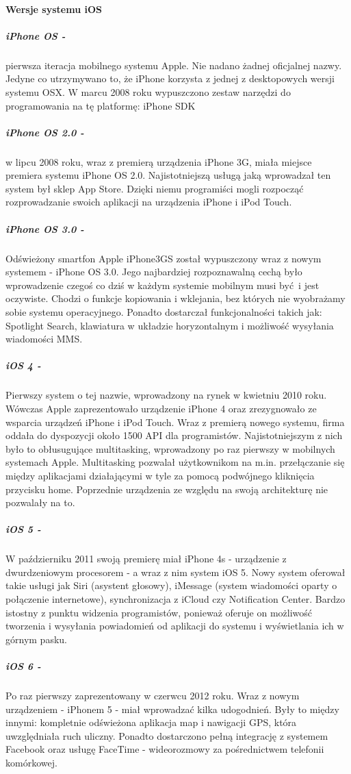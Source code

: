 \documentclass[12pt,oneside,a4paper]{report}
\begin{document}
\paragraph{Wersje systemu iOS}
\subparagraph{iPhone OS -}pierwsza iteracja mobilnego systemu Apple. Nie nadano żadnej oficjalnej nazwy. Jedyne co utrzymywano to, że iPhone korzysta z jednej z desktopowych wersji systemu OSX.\cite{iphoneOSX} 
W marcu 2008 roku wypuszczono zestaw narzędzi do programowania na tę platformę: iPhone SDK \cite{iphoneSDK}
\subparagraph{iPhone OS 2.0 -}w lipcu 2008 roku, wraz z premierą urządzenia iPhone 3G, miała miejsce premiera systemu iPhone OS 2.0. Najistotniejszą usługą jaką wprowadzał ten system był sklep App Store. Dzięki niemu programiści mogli rozpocząć rozprowadzanie swoich aplikacji na urządzenia iPhone i iPod Touch. \cite{iphone3GappStore}
\subparagraph{iPhone OS 3.0 -}Odświeżony smartfon Apple iPhone3GS został wypuszczony wraz z nowym systemem - iPhone OS 3.0. Jego najbardziej rozpoznawalną cechą było wprowadzenie czegoś co dziś w każdym systemie mobilnym musi być i jest oczywiste. Chodzi o funkcje kopiowania i wklejania, bez których nie wyobrażamy sobie systemu operacyjnego. Ponadto dostarczał funkcjonalności takich jak: Spotlight Search, klawiatura w układzie horyzontalnym i możliwość wysyłania wiadomości MMS.\cite{iphoneOS3}
\subparagraph{iOS 4 -}Pierwszy system o tej nazwie, wprowadzony na rynek w kwietniu 2010 roku. Wówczas Apple zaprezentowało urządzenie iPhone 4 oraz zrezygnowało ze wsparcia urządzeń iPhone i iPod Touch. Wraz z premierą nowego systemu, firma oddała do dyspozycji około 1500 API dla programistów. Najistotniejszym z nich było to obłusugujące multitasking, wprowadzony po raz pierwszy w mobilnych systemach Apple. Multitasking pozwalał użytkownikom na m.in. przełączanie się między aplikacjami działającymi w tyle za pomocą podwójnego kliknięcia przycisku home. Poprzednie urządzenia ze względu na swoją architekturę nie pozwalały na to.\cite{ios4}
\subparagraph{iOS 5 -}W październiku 2011 swoją premierę miał iPhone 4s - urządzenie z dwurdzeniowym procesorem - a wraz z nim system iOS 5. Nowy system oferował takie usługi jak Siri (asystent głosowy), iMessage (system wiadomości oparty o połączenie internetowe), synchronizacja z iCloud czy Notification Center. Bardzo istostny z punktu widzenia programistów, ponieważ oferuje on możliwość tworzenia i wysyłania powiadomień od aplikacji do systemu i wyświetlania ich w górnym pasku.\cite{ios5}
\subparagraph{iOS 6 -}Po raz pierwszy zaprezentowany w czerwcu 2012 roku. Wraz z nowym urządzeniem - iPhonem 5 - miał wprowadzać kilka udogodnień. Były to między innymi: kompletnie odświeżona aplikacja map i nawigacji GPS, która uwzględniała ruch uliczny. Ponadto dostarczono pełną integrację z systemem Facebook oraz usługę FaceTime - wideorozmowy za pośrednictwem telefonii komórkowej.\cite{ios6}
\end{document}

